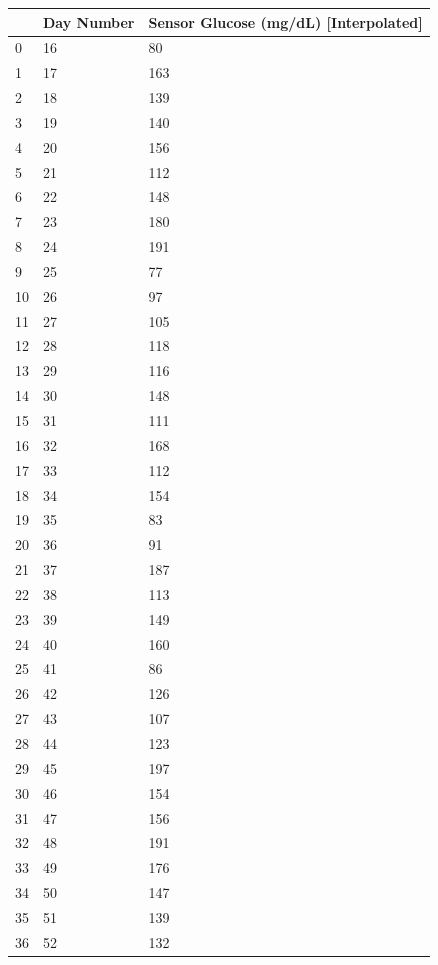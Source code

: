 \bigskip\noindent
\begin{tabular}{p{}p{}p{}}
\toprule
 & Day Number & Sensor Glucose (mg/dL) [Interpolated] \\
\hline
0 & 16 & 80 \\
\hline
1 & 17 & 163 \\
\hline
2 & 18 & 139 \\
\hline
3 & 19 & 140 \\
\hline
4 & 20 & 156 \\
\hline
5 & 21 & 112 \\
\hline
6 & 22 & 148 \\
\hline
7 & 23 & 180 \\
\hline
8 & 24 & 191 \\
\hline
9 & 25 & 77 \\
\hline
10 & 26 & 97 \\
\hline
11 & 27 & 105 \\
\hline
12 & 28 & 118 \\
\hline
13 & 29 & 116 \\
\hline
14 & 30 & 148 \\
\hline
15 & 31 & 111 \\
\hline
16 & 32 & 168 \\
\hline
17 & 33 & 112 \\
\hline
18 & 34 & 154 \\
\hline
19 & 35 & 83 \\
\hline
20 & 36 & 91 \\
\hline
21 & 37 & 187 \\
\hline
22 & 38 & 113 \\
\hline
23 & 39 & 149 \\
\hline
24 & 40 & 160 \\
\hline
25 & 41 & 86 \\
\hline
26 & 42 & 126 \\
\hline
27 & 43 & 107 \\
\hline
28 & 44 & 123 \\
\hline
29 & 45 & 197 \\
\hline
30 & 46 & 154 \\
\hline
31 & 47 & 156 \\
\hline
32 & 48 & 191 \\
\hline
33 & 49 & 176 \\
\hline
34 & 50 & 147 \\
\hline
35 & 51 & 139 \\
\hline
36 & 52 & 132 \\

\end{tabular}
